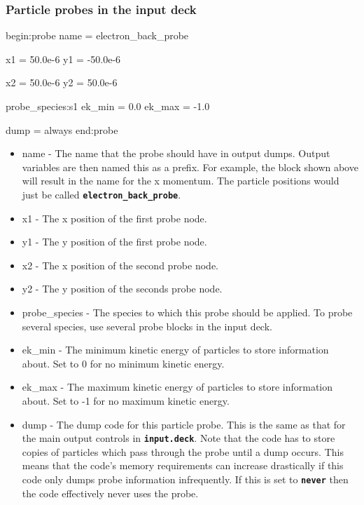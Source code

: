 \documentclass[12pt,a4paper]{article}
\newcommand{\inlinecode}[1]{{\color{warwickred} \bf\texttt{#1}}}
\newenvironment{boxverbatim}{\lboxverbatim{none}}{\endlboxverbatim}
\begin{document}
\subsubsection{Particle probes in the input deck}
\begin{boxverbatim}
begin:probe
   name = electron_back_probe

   x1 = 50.0e-6
   y1 = -50.0e-6

   x2 = 50.0e-6
   y2 = 50.0e-6

   probe_species:s1
   ek_min = 0.0
   ek_max = -1.0

   dump = always
end:probe
\end{boxverbatim}
\begin{itemize}
\item name - The name that the probe should have in output dumps. Output
  variables are then named this as a prefix. For example, the block shown above
  will result in the name\linebreak \inlinecode{electron\_back\_probe\_px} for
  the x momentum. The particle positions would just be called\linebreak
  \inlinecode{electron\_back\_probe}.
\item x1 - The x position of the first probe node.
\item y1 - The y position of the first probe node.
\item x2 - The x position of the second probe node.
\item y2 - The y position of the seconds probe node.
\item probe\_species - The species to which this probe should be
  applied. To probe several species, use several probe blocks in the input
  deck.
\item ek\_min - The minimum kinetic energy of particles to store information
  about. Set to 0 for no minimum kinetic energy.
\item ek\_max - The maximum kinetic energy of particles to store information
  about. Set to -1 for no maximum kinetic energy.
\item dump - The dump code for this particle probe. This is the same as that
  for the main output controls in \inlinecode{input.deck}. Note that the code
  has to store copies of particles which pass through the probe until a dump
  occurs. This means that the code's memory requirements can increase
  drastically if this code only dumps probe information infrequently. If this
  is set to \inlinecode{never} then the code effectively never uses the probe.
\end{itemize}
\end{document}
